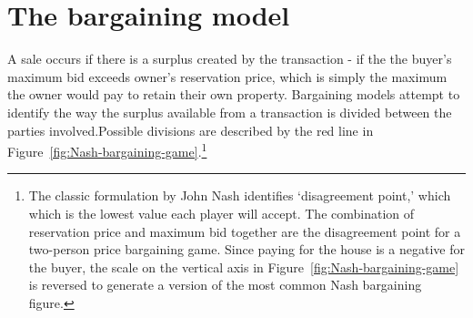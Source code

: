 {%


        

    
\section{The bargaining model} \label{sec:bargaining-model}
 A sale occurs if there is a surplus  created by the transaction - if the the buyer's maximum bid exceeds owner's \gls{reservation price}, which is simply the maximum the owner would pay to retain their own property.  Bargaining models attempt to identify the way the surplus available from a transaction is divided between the parties involved.Possible divisions are described by the red line in Figure~\ref{fig:Nash-bargaining-game}.\footnote{The classic  formulation by John Nash %
identifies  `\gls{disagreement point},' which which is the  lowest value each player will accept. The combination of reservation price and maximum bid together are the disagreement point for a two-person price bargaining game. Since paying for the house is a negative for the buyer, the scale on the vertical axis  in Figure~\ref{fig:Nash-bargaining-game} is reversed to generate a version of the most common Nash bargaining figure.} 

}

